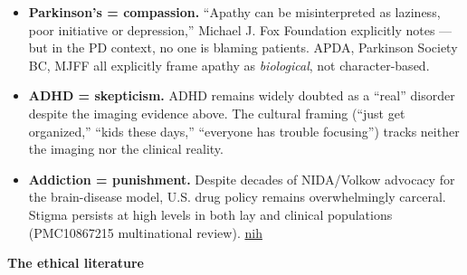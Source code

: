 \begin{itemize}
\tightlist
\item
  \textbf{Parkinson's = compassion.} ``Apathy can be misinterpreted as laziness, poor initiative or depression,'' Michael J. Fox Foundation explicitly notes --- but in the PD context, no one is blaming patients. APDA, Parkinson Society BC, MJFF all explicitly frame apathy as \emph{biological}, not character-based.
\item
  \textbf{ADHD = skepticism.} ADHD remains widely doubted as a ``real'' disorder despite the imaging evidence above. The cultural framing (``just get organized,'' ``kids these days,'' ``everyone has trouble focusing'') tracks neither the imaging nor the clinical reality.
\item
  \textbf{Addiction = punishment.} Despite decades of NIDA/Volkow advocacy for the brain-disease model, U.S. drug policy remains overwhelmingly carceral. Stigma persists at high levels in both lay and clinical populations (PMC10867215 multinational review). \href{https://www.ncbi.nlm.nih.gov/pmc/articles/PMC10867215/}{nih}
\end{itemize}

\textbf{The ethical literature}

